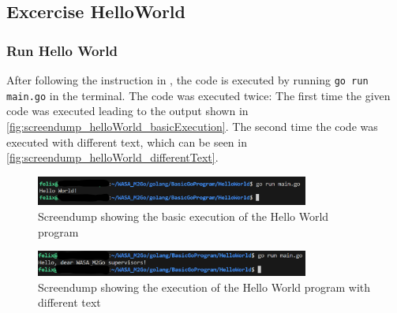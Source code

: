 \subsection{Excercise HelloWorld}
\label{sec:excercise_hello_world}
\subsubsection*{Run Hello World}
After following the instruction in \cite{MS-GODEV}, the code is executed by running \texttt{go run main.go} in the terminal.
The code was executed twice: The first time the given code was executed leading to the output shown in \autoref{fig:screendump_helloWorld_basicExecution}.
The second time the code was executed with different text, which can be seen in \autoref{fig:screendump_helloWorld_differentText}.

\begin{figure}[H]
    \centering
    \includegraphics[width=0.8\textwidth]{figures/goLang/helloWorld/golang_helloWorld_basicExecution.png}
    \caption{Screendump showing the basic execution of the Hello World program}
    \label{fig:screendump_helloWorld_basicExecution}
\end{figure}

\begin{figure}[H]
    \centering
    \includegraphics[width=0.8\textwidth]{figures/goLang/helloWorld/golang_helloWorld_ExecutionDifferentText.png}
    \caption{Screendump showing the execution of the Hello World program with different text}
    \label{fig:screendump_helloWorld_differentText}
\end{figure}

